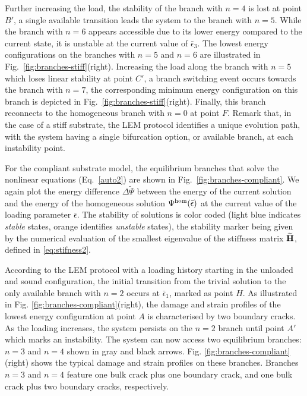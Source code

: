 \documentclass[10pt]{article}
\begin{document}
Further increasing the load, the stability of the branch with $n=4$ is lost at point $B'$, a single available transition leads the system to the branch with $n=5$. While the branch with $n=6$ appears accessible due to its lower energy compared to the current state, it is unstable at the current value of $\bar\epsilon_3$. The lowest energy configurations on the branches with $n=5$ and $n=6$ are illustrated in Fig.~\ref{fig:branches-stiff}(right). Increasing the load along the branch with $n=5$ which loses linear stability at point $C'$, a branch switching event occurs towards the branch with $n=7$, the corresponding minimum energy configuration on this branch is depicted in Fig.~\ref{fig:branches-stiff}(right). Finally, this branch reconnects to the homogeneous branch with $n=0$ at point $F$. Remark that, in the case of a stiff substrate, the LEM protocol identifies a unique evolution path, with the system having a single bifurcation option, or available branch, at each instability point.

For the compliant substrate model, the equilibrium branches that solve the nonlinear equations (Eq.~\ref{auto2}) are shown in Fig.~\ref{fig:branches-compliant}. 
We again plot the energy difference $\Delta \widetilde\Psi$ between the energy of the current solution and the energy of the homogeneous solution $\Psi^\text{hom} (\bar{\epsilon})$ at the current value of the loading parameter $\bar\epsilon$. 
The stability of solutions is color coded (light blue indicates \emph{stable} states, orange identifies \emph{unstable} states), the stability marker being given by the numerical evaluation of the smallest eigenvalue of the stiffness matrix $\widetilde{\mathbf{H}}$, defined in \eqref{eq:stifness2}.

According to the LEM protocol with a loading history starting in the unloaded and sound configuration, the initial transition from the trivial solution to the only available branch with $n=2$ occurs at $\bar \epsilon_1$, marked as point $H$. As illustrated in Fig. \ref{fig:branches-compliant}(right), the damage and strain profiles of the lowest energy configuration at point $A$ is characterised by two boundary cracks. As the loading increases, the system persists on the $n=2$ branch until point $A'$ which marks an instability. The system can now access two equilibrium branches: $n=3$ and $n=4$ shown in gray and black arrows. Fig. \ref{fig:branches-compliant}(right) shows the typical damage and strain profiles on these branches. Branches $n=3$ and $n=4$ feature one bulk crack plus one boundary crack, and one bulk crack plus two boundary cracks, respectively. 
\end{document}
